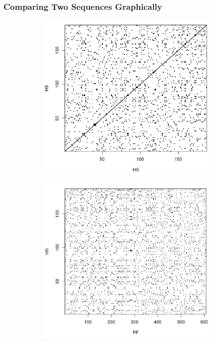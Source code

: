 \documentclass[compress]{beamer}
\begin{document}
\begin{frame}
\frametitle{Comparing Two Sequences Graphically} 
\begin{figure}[h!]
  \centering
   
   \begin{subfigure}[b]{0.35\textwidth}
    \centering
    \includegraphics[width=1.0\textwidth]{hs-hs}
   \end{subfigure}
    \begin{subfigure}[b]{0.35\textwidth}
    \centering
    \includegraphics[width=1.0\textwidth]{hs-pf}
   \end{subfigure}
   

\end{figure}
\end{frame}
\end{document}
